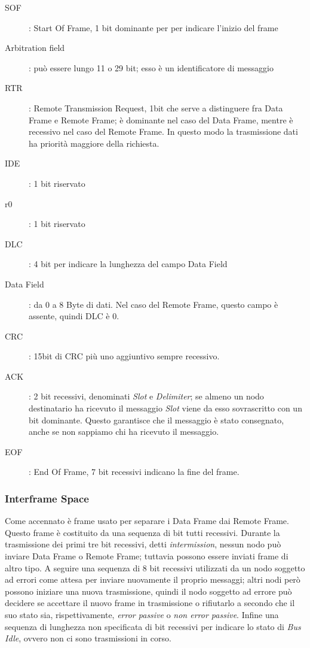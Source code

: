 \documentclass[a4paper,10pt]{book}
\begin{document}
\begin{description}
 \item[SOF]: Start Of Frame, 1 bit dominante per per indicare
l'inizio del frame
 \item[Arbitration field]: può essere lungo 11 o 29 bit; esso è un
identificatore di messaggio
 \item[RTR]: Remote Transmission Request, 1bit che serve a distinguere
fra Data Frame e Remote Frame; è dominante nel caso del Data Frame,
mentre è recessivo nel caso del Remote Frame. In questo modo la
trasmissione dati ha priorità maggiore della richiesta.
 \item[IDE]: 1 bit riservato
 \item[r0]: 1 bit riservato
 \item[DLC]: 4 bit per indicare la lunghezza del campo Data Field
 \item[Data Field]: da 0 a 8 Byte di dati. Nel caso del Remote Frame,
questo campo è assente, quindi DLC è 0.
 \item[CRC]: 15bit di CRC più uno aggiuntivo sempre recessivo.
 \item[ACK]: 2 bit recessivi, denominati \textit{Slot} e
\textit{Delimiter}; se almeno un nodo destinatario ha ricevuto il
messaggio \textit{Slot} viene da esso sovrascritto con un bit
dominante. Questo garantisce che il messaggio è stato consegnato,
anche se non sappiamo chi ha ricevuto il messaggio.
 \item[EOF]: End Of Frame, 7 bit recessivi indicano la fine del frame.
\end{description}

\subsubsection{Interframe Space}
Come accennato è frame usato per separare i Data Frame dai Remote
Frame. Questo frame è costituito da una sequenza di bit tutti
recessivi. Durante la trasmissione dei primi tre bit recessivi, detti
\textit{intermission}, nessun nodo può inviare Data Frame o Remote
Frame; tuttavia possono essere inviati frame di altro tipo. A seguire
una sequenza di 8 bit recessivi utilizzati da un nodo soggetto ad
errori come attesa per inviare nuovamente il proprio messaggi; altri
nodi però possono iniziare una nuova trasmissione, quindi il nodo
soggetto ad errore può decidere se accettare il nuovo frame in
trasmissione o rifiutarlo a secondo che il suo stato sia,
rispettivamente, \textit{error passive} o \textit{non error passive}.
Infine una sequenza di lunghezza non specificata di bit recessivi per
indicare lo stato di \textit{Bus Idle}, ovvero non ci sono
trasmissioni in corso.
\end{document}
